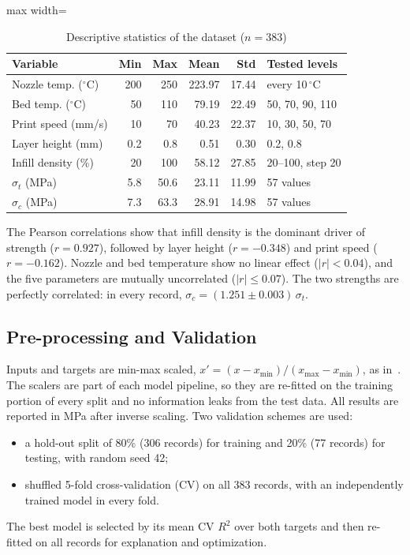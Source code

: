 \documentclass[conference,12pt]{IEEEtran}
\newcommand{\degC}{\ensuremath{^{\circ}}C}
\begin{document}
\begin{table}[!t]
\caption{Descriptive statistics of the dataset ($n = 383$)}
\label{tab:data}
\centering
\setlength{\tabcolsep}{4pt}
\begin{adjustbox}{max width=\columnwidth}
\begin{tabular}{@{}lrrrrl@{}}
\toprule
Variable & Min & Max & Mean & Std & Tested levels \\
\midrule
Nozzle temp. (\degC) & 200 & 250 & 223.97 & 17.44 & every 10\,\degC \\
Bed temp. (\degC) & 50 & 110 & 79.19 & 22.49 & 50, 70, 90, 110 \\
Print speed (mm/s) & 10 & 70 & 40.23 & 22.37 & 10, 30, 50, 70 \\
Layer height (mm) & 0.2 & 0.8 & 0.51 & 0.30 & 0.2, 0.8 \\
Infill density (\%) & 20 & 100 & 58.12 & 27.85 & 20--100, step 20 \\
$\sigma_t$ (MPa) & 5.8 & 50.6 & 23.11 & 11.99 & 57 values \\
$\sigma_c$ (MPa) & 7.3 & 63.3 & 28.91 & 14.98 & 57 values \\
\bottomrule
\end{tabular}
\end{adjustbox}
\end{table}

The Pearson correlations show that infill density is the dominant driver of strength ($r = 0.927$), followed by layer height ($r = -0.348$) and print speed ($r = -0.162$). Nozzle and bed temperature show no linear effect ($|r| < 0.04$), and the five parameters are mutually uncorrelated ($|r| \leq 0.07$). The two strengths are perfectly correlated: in every record, $\sigma_c = (1.251 \pm 0.003)\,\sigma_t$.


\subsection{Pre-processing and Validation}
Inputs and targets are min-max scaled, $x' = (x - x_{\min})/(x_{\max} - x_{\min})$, as in~\cite{munshi2026}. The scalers are part of each model pipeline, so they are re-fitted on the training portion of every split and no information leaks from the test data. All results are reported in MPa after inverse scaling. Two validation schemes are used:
\begin{itemize}
\item a hold-out split of 80\% (306 records) for training and 20\% (77 records) for testing, with random seed 42;
\item shuffled 5-fold cross-validation (CV) on all 383 records, with an independently trained model in every fold.
\end{itemize}
The best model is selected by its mean CV $R^2$ over both targets and then re-fitted on all records for explanation and optimization.
\end{document}
